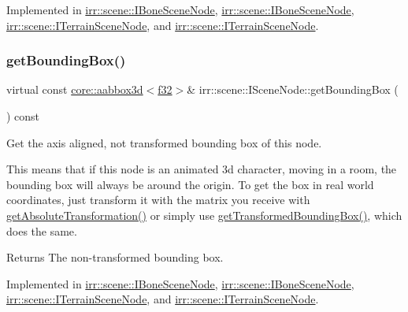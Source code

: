 Implemented in \hyperlink{classirr_1_1scene_1_1IBoneSceneNode_ac5d0a610b0a24a7501f29ad000d28b3b}{irr\+::scene\+::\+I\+Bone\+Scene\+Node}, \hyperlink{classirr_1_1scene_1_1IBoneSceneNode_ac5d0a610b0a24a7501f29ad000d28b3b}{irr\+::scene\+::\+I\+Bone\+Scene\+Node}, \hyperlink{classirr_1_1scene_1_1ITerrainSceneNode_a02a14fe28f5a326fca819c36bee2e92e}{irr\+::scene\+::\+I\+Terrain\+Scene\+Node}, and \hyperlink{classirr_1_1scene_1_1ITerrainSceneNode_a02a14fe28f5a326fca819c36bee2e92e}{irr\+::scene\+::\+I\+Terrain\+Scene\+Node}.

\mbox{\label{classirr_1_1scene_1_1ISceneNode_a223f718fc2f4944b5ad28c592f6cc8c6}} 
\subsubsection{\texorpdfstring{get\+Bounding\+Box()}{getBoundingBox()}\hspace{0.1cm}{\footnotesize\ttfamily [2/2]}}
{\footnotesize\ttfamily virtual const \hyperlink{classirr_1_1core_1_1aabbox3d}{core\+::aabbox3d}$<$\hyperlink{namespaceirr_a0277be98d67dc26ff93b1a6a1d086b07}{f32}$>$\& irr\+::scene\+::\+I\+Scene\+Node\+::get\+Bounding\+Box (\begin{DoxyParamCaption}{ }\end{DoxyParamCaption}) const\hspace{0.3cm}{\ttfamily [pure virtual]}}



Get the axis aligned, not transformed bounding box of this node. 

This means that if this node is an animated 3d character, moving in a room, the bounding box will always be around the origin. To get the box in real world coordinates, just transform it with the matrix you receive with \hyperlink{classirr_1_1scene_1_1ISceneNode_af13dc546a7be796cc0868a2eec51e508}{get\+Absolute\+Transformation()} or simply use \hyperlink{classirr_1_1scene_1_1ISceneNode_a77746edcc479107067fbf1f4471ab412}{get\+Transformed\+Bounding\+Box()}, which does the same. \begin{DoxyReturn}{Returns}
The non-\/transformed bounding box. 
\end{DoxyReturn}


Implemented in \hyperlink{classirr_1_1scene_1_1IBoneSceneNode_ac5d0a610b0a24a7501f29ad000d28b3b}{irr\+::scene\+::\+I\+Bone\+Scene\+Node}, \hyperlink{classirr_1_1scene_1_1IBoneSceneNode_ac5d0a610b0a24a7501f29ad000d28b3b}{irr\+::scene\+::\+I\+Bone\+Scene\+Node}, \hyperlink{classirr_1_1scene_1_1ITerrainSceneNode_a02a14fe28f5a326fca819c36bee2e92e}{irr\+::scene\+::\+I\+Terrain\+Scene\+Node}, and \hyperlink{classirr_1_1scene_1_1ITerrainSceneNode_a02a14fe28f5a326fca819c36bee2e92e}{irr\+::scene\+::\+I\+Terrain\+Scene\+Node}.

